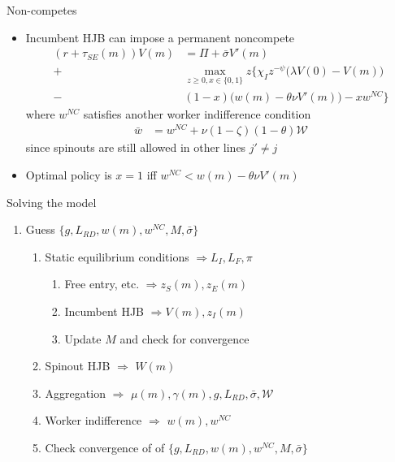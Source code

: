 \documentclass[english,usenames,dvipsnames]{beamer}
\begin{document}
\begin{frame}{Non-competes}
\begin{itemize}
	\item Incumbent HJB can impose a permanent noncompete
	\small
	\begin{align*}
	(r + \tau_{SE}(m)) V(m) &= \Pi + \bar{\sigma}V'(m)  \\
	+ &\max_{z \ge 0, x \in \{0,1\} } z \Bigg\{ \chi_I z^{-\psi} \Big( \lambda V(0) - V(m) \Big) \\
	- &(1-x) \Big(w(m) - \theta \nu V'(m) \Big) - x w^{NC} \Bigg\}
	\end{align*}
	\normalsize
	where $w^{NC}$ satisfies another worker indifference condition
	\begin{align*}
		\bar{w} &= w^{NC} + \nu (1-\zeta) (1-\theta) \mathcal{W}
	\end{align*}
	since spinouts are still allowed in other lines $j' \ne j$
	\item Optimal policy is $x = 1$ iff $w^{NC} < w(m) - \theta \nu V'(m)$ 
\end{itemize}
\end{frame}


\begin{frame}{Solving the model}
\begin{enumerate}
	\small
	\item Guess $\{g, L_{RD}, w(m), w^{NC}, M, \bar{\sigma} \}$
	\begin{enumerate}
		\small
		\item Static equilibrium conditions $\Rightarrow L_I,L_F,\pi$
		\begin{enumerate}
			\small
			\item Free entry, etc. $\Rightarrow z_S(m), z_E(m)$
			\item Incumbent HJB $\Rightarrow  V(m),z_I(m)$
			\item Update $M$ and check for convergence
		\end{enumerate}
		\item Spinout HJB $\Rightarrow$ $W(m)$
		\item Aggregation $\Rightarrow$ $\mu(m),\gamma(m),g,L_{RD},\bar{\sigma},\mathcal{W}$
		\item Worker indifference $\Rightarrow$ $w(m),w^{NC}$
		\item Check convergence of of $\{g, L_{RD}, w(m), w^{NC}, M, \bar{\sigma} \}$
	\end{enumerate}
\end{enumerate}
\end{frame}
\end{document}
